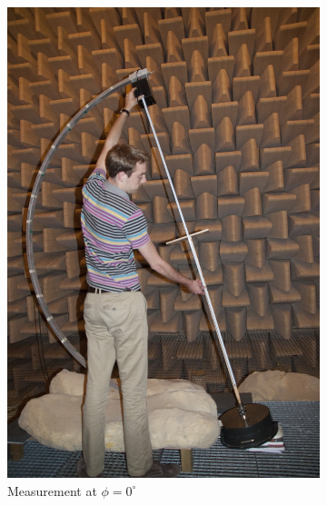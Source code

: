 \begin{figure}[h!]
\begin{subfigure}[b]{0.33\textwidth}
                \centering
    			\includegraphics[height=0.28\textheight]{afbeeldingen/tim.jpg}
    			\caption{Measurement at $\phi=0^\circ$}
			    \label{fig:tim}
        \end{subfigure}
        
        \begin{subfigure}[b]{0.5\textwidth}
			    

\end{subfigure}
\end{figure}
